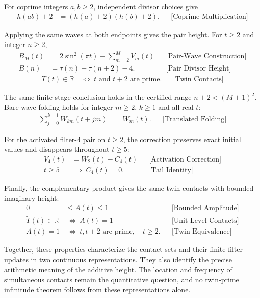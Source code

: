 For coprime integers $a,b\ge2$, independent divisor choices give
\begin{equation*}
\begin{aligned}
h(ab)+2&=(h(a)+2)(h(b)+2).
&&\text{[Coprime Multiplication]}
\end{aligned}
\end{equation*}

Applying the same waves at both endpoints gives the pair height. For $t\ge2$
and integer $n\ge2$,
\begin{equation*}
\begin{aligned}
B_M(t)&=2\sin^2(\pi t)+\sum_{m=2}^{M}V_m(t)
&&\text{[Pair-Wave Construction]}\\
B(n)&=\tau(n)+\tau(n+2)-4.
&&\text{[Pair Divisor Height]}
\end{aligned}
\end{equation*}
\begin{equation*}
\begin{aligned}
T(t)\in\mathbb R
&\ \Longleftrightarrow\ t\text{ and }t+2\text{ are prime}.
&&\text{[Twin Contacts]}
\end{aligned}
\end{equation*}

The same finite-stage conclusion holds in the certified range
$n+2 < (M+1)^2$. Bare-wave folding holds for integer $m\ge2$, $k\ge1$ and
all real $t$:
\begin{equation*}
\begin{aligned}
\sum_{j=0}^{k-1}W_{km}(t+jm)&=W_m(t).
&&\text{[Translated Folding]}
\end{aligned}
\end{equation*}

For the activated filter-$4$ pair on $t\ge2$, the correction preserves exact
initial values and disappears throughout $t\ge5$:
\begin{equation*}
\begin{aligned}
V_4(t)&=W_2(t)-C_4(t)
&&\text{[Activation Correction]}\\
t\ge5&\ \Longrightarrow\ C_4(t)=0.
&&\text{[Tail Identity]}
\end{aligned}
\end{equation*}

Finally, the complementary product gives the same twin contacts with bounded
imaginary height:
\begin{equation*}
\begin{aligned}
0&\le A(t)\le1
&&\text{[Bounded Amplitude]}\\
\widetilde T(t)\in\mathbb R&\ \Longleftrightarrow\ A(t)=1
&&\text{[Unit-Level Contacts]}\\
A(t)=1&\ \Longleftrightarrow\ t,t+2\text{ are prime},\quad t\ge2.
&&\text{[Twin Equivalence]}
\end{aligned}
\end{equation*}

Together, these properties characterize the contact sets and their finite
filter updates in two continuous representations. They also identify the
precise arithmetic meaning of the additive height. The location and
frequency of simultaneous contacts remain the quantitative question, and no
twin-prime infinitude theorem follows from these representations alone.
